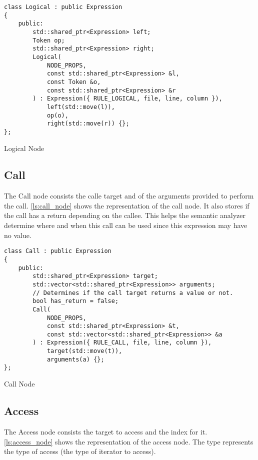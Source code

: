 \begin{listing}[H]
\begin{verbatim}
class Logical : public Expression
{
    public:
        std::shared_ptr<Expression> left;
        Token op;
        std::shared_ptr<Expression> right;
        Logical(
            NODE_PROPS,
            const std::shared_ptr<Expression> &l,
            const Token &o,
            const std::shared_ptr<Expression> &r
        ) : Expression({ RULE_LOGICAL, file, line, column }),
            left(std::move(l)),
            op(o),
            right(std::move(r)) {};
};
\end{verbatim}
\caption{Logical Node}
\label{ls:logical_node}
\end{listing}

\subsection{Call}

The Call node consists the calle target and of the arguments provided to perform the call.
\autoref{ls:call_node} shows the representation of the call node. It also stores if the call has a return
depending on the callee. This helps the semantic analyzer determine where and when this call can be used since
this expression may have no value.

\begin{listing}[H]
\begin{verbatim}
class Call : public Expression
{
    public:
        std::shared_ptr<Expression> target;
        std::vector<std::shared_ptr<Expression>> arguments;
        // Determines if the call target returns a value or not.
        bool has_return = false;
        Call(
            NODE_PROPS,
            const std::shared_ptr<Expression> &t,
            const std::vector<std::shared_ptr<Expression>> &a
        ) : Expression({ RULE_CALL, file, line, column }),
            target(std::move(t)),
            arguments(a) {};
};
\end{verbatim}
\caption{Call Node}
\label{ls:call_node}
\end{listing}

\subsection{Access}

The Access node consists the target to access and the index for it.
\autoref{ls:access_node} shows the representation of the access node.
The type represents the type of access (the type of iterator to access).

